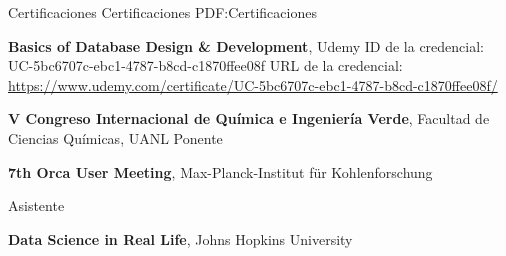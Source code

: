 \Section
{Certificaciones}
{Certificaciones}
{PDF:Certificaciones}

\Entry
    {\textbf{Basics of Database Design \& Development}},
    \newline
    Udemy
    \Gap
    \BulletItem
    ID de la credencial: UC-5bc6707c-ebc1-4787-b8cd-c1870ffee08f
    URL de la credencial: \url{https://www.udemy.com/certificate/UC-5bc6707c-ebc1-4787-b8cd-c1870ffee08f/}
    \hfill

\Entry
    {\textbf{V Congreso Internacional de Química e Ingeniería Verde}},
    \newline
    Facultad de Ciencias Químicas, UANL
\Gap
    \BulletItem
    Ponente
    \hfill

\Entry
    {\textbf{7th Orca User Meeting}},
    \newline
    Max-Planck-Institut für Kohlenforschung

    \Gap
    \BulletItem
    Asistente
    \hfill

\Entry
{\textbf{Data Science in Real Life}},
\newline
Johns Hopkins University
\hfill
{}